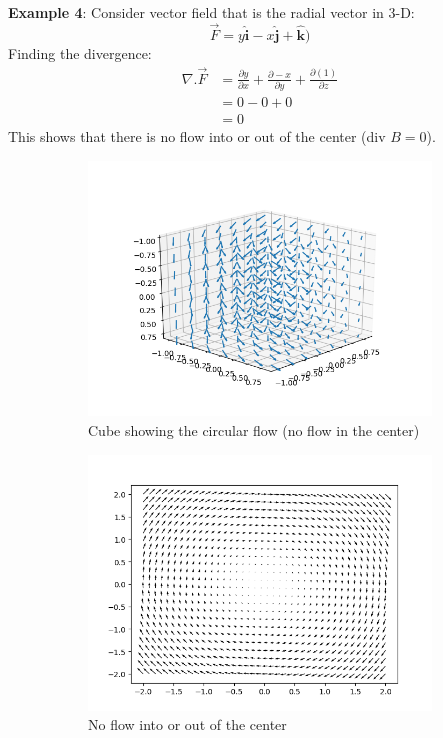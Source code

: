 \documentclass[10pt,a4paper]{article}
\begin{document}
\pagebreak
\textbf{Example 4}: Consider vector field that is the radial vector in 3-D:
$$
    \overrightarrow{F} = y\hat{\textbf{i}}-x\hat{\textbf{j}}+\hat{\textbf{k}})
$$
Finding the divergence:
\begin{align*}
    \nabla.\overrightarrow{F} &= \frac{\partial y}{\partial x} + \frac{\partial -x}{\partial y} + \frac{\partial (1)}{\partial z} \\
    &= 0 - 0 + 0 \\
    &= 0
\end{align*}
This shows that there is no flow into or out of the center (div $B = 0$).
\begin{figure}[h]
\centering
\begin{subfigure}{.5\textwidth}
  \centering
  \includegraphics[scale=0.3]{Radial_none.png}
  \caption{Cube showing the circular flow (no flow in the center)}
  \label{fig:sub1}
\end{subfigure}%
\begin{subfigure}{.5\textwidth}
  \centering
  \includegraphics[scale=0.3]{2D_none.png}
  \caption{No flow into or out of the center}
  \label{fig:sub2}
\end{subfigure}
\caption*{}
\label{fig:test}
\end{figure}
\end{document}
